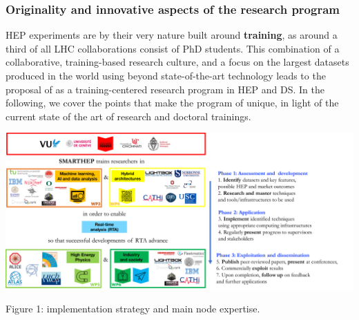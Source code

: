 


 
\vspace{-2mm}
\subsubsection{Originality and innovative aspects of the research program} 
\label{sub:Originality}

HEP experiments are by their very nature built around \textbf{training}, 
as around a third of all LHC collaborations consist of PhD students.
This combination of a collaborative, training-based research culture, and a focus on the largest datasets
produced in the world using beyond state-of-the-art technology
leads to the proposal of \acronym as a training-centered research program in HEP and DS.
In the following, we cover the points that make the program of \acronym unique, 
in light of the current state of the art of research and doctoral trainings. 

\includegraphics[width=\textwidth]{figs/NetworkCompositionCombinedImplementation} %
\begin{center}\footnotesize \label{fig:implementation}
Figure 1: \acronym implementation strategy and main node expertise.
\end{center}%
\normalsize 
\vspace{-2mm}
 
